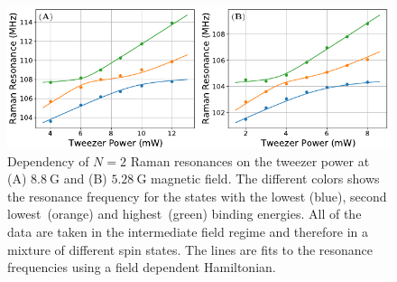\begin{figure}
  \centering
  \includegraphics[width=\textwidth]{figures/raman_spectroscopy_n2_fit.pdf}
  \caption[$N=2$ Raman resonances and fitting to external field strengths.]{
    Dependency of $N=2$ Raman resonances on the tweezer power at
    (A) $8.8~\mathrm{G}$ and (B) $5.28~\mathrm{G}$ magnetic field.
    The different colors shows the resonance frequency for the states with
    the lowest (blue), second lowest~(orange) and highest~(green) binding energies.
    All of the data are taken in the intermediate field regime
    and therefore in a mixture of different spin states.
    The lines are fits to the resonance frequencies using a field dependent Hamiltonian.
    \label{fig:raman-spectroscopy:n2-fit}}
\end{figure}

